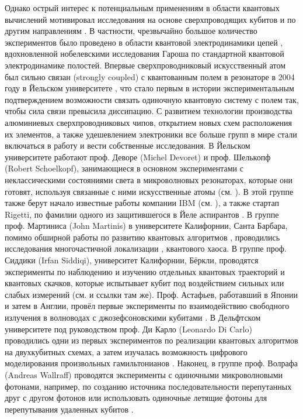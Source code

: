 \documentclass[14pt, a4paper]{extreport}
\numberwithin{equation}{section}
\begin{document}
Однако острый интерес к потенциальным применениям в области квантовых вычислений мотивировал исследования на основе сверхпроводящих кубитов и по другим направлениям \cite{kjaergaard2020superconducting}. В частности, чрезвычайно большое количество экспериментов было проведено в области квантовой электродинамики цепей \cite{blais2020quantum}, вдохновленной нобелевскими исследования Гароша \cite{haroche2013nobel} по стандартной квантовой электродинамике полостей. Впервые сверхпроводниковый искусственный атом был сильно связан (strongly coupled) с квантованным полем в резонаторе в 2004 году в Йельском университете \cite{wallraff2004strong}, что стало первым в истории экспериментальным подтверждением возможности связать одиночную квантовую систему с полем так, чтобы сила связи превысила диссипацию. С развитием технологии производства алюминиевых сверхпроводниковых чипов, открытием новых схем расположения их элементов, а также удешевлением электроники все больше групп в мире стали включаться в работу и вести собственные исследования. В Йельском университете работают проф. Деворе (Michel Devoret) и проф. Шелькопф (Robert Schoelkopf), занимающиеся в основном экспериментами с неклассическими состояниями света в микроволновых резонаторах, которые они готовят, используя связанные с ними искусственные атомы (см. \cite{vlastakis2013deterministically, mirrahimi2014dynamically}). В этой группе также берут начало известные работы компании IBM (см. \cite{jurcevic2020demonstration}), а также стартап Rigetti, по фамилии одного из защитившегося в Йеле аспирантов \cite{reagor2018demonstration}. В группе проф. Мартиниса (John Martinis) в университете Калифорнии, Санта Барбара, помимо обширной работы по развитию квантовых алгоритмов \cite{arute2019quantum}, проводились исследования многочастичной локализации \cite{chen2014emulating, roushan2017spectroscopic}, квантового хаоса. В группе проф. Сиддики (Irfan Siddiqi), университет Калифорнии, Бёркли, проводятся эксперименты по наблюдению и изучению отдельных квантовых траекторий и квантовых скачков, которые испытывает кубит под воздействием сильных или слабых измерений (см. \cite{hacohen2016quantum} и ссылки там же). Проф. Астафьев, работавший в Японии и затем в Англии, провёл первые эксперименты по взаимодействию свободного излучения в волноводах с джозефсоновскими кубитами \cite{astafiev2010resonance}. В Дельфтском университете под руководством проф. Ди Карло (Leonardo Di Carlo) проводились одни из первых экспериментов по реализации квантовых алгоритмов на двухкубитных схемах, а затем изучалась возможность цифрового моделирования произвольных гамильтонианов \cite{langford2017experimentally}. Наконец, в группе проф. Волрафа (Andreas Wallraff) проводятся эксперименты с одиночными микроволновыми фотонами, например, по созданию источника последовательности перепутанных друг с другом фотонов \cite{besse2020realizing} или использовать одиночные летящие фотоны для перепутывания удаленных кубитов \cite{kurpiers2018deterministic}.
\end{document}
